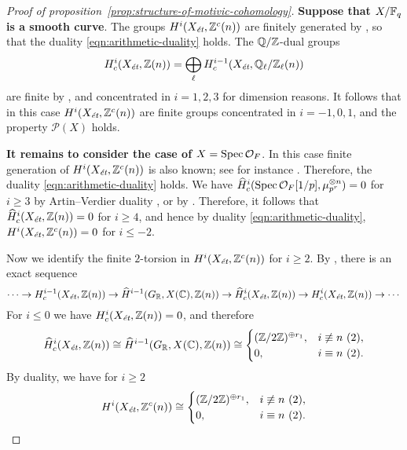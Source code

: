 \documentclass{article}
\numberwithin{equation}{section}
\begin{document}
\begin{proof}[Proof of proposition~\ref{prop:structure-of-motivic-cohomology}]
  \vspace{1em}

  \textbf{Suppose that $X/\FF_q$ is a smooth curve}. The groups
  $H^i (X_\et, \ZZ^c (n))$ are finitely generated by
  \cite[Proposition~4.3]{Geisser-2017}, so that the duality
  \eqref{eqn:arithmetic-duality} holds. The $\QQ/\ZZ$-dual groups
  \[ H^i_c (X_\et, \ZZ(n)) =
    \bigoplus_\ell H^{i-1}_c (X_\et, \QQ_\ell/\ZZ_\ell (n)) \]
  are finite by \cite[Theorem~3]{Kahn-2003}, and concentrated in
  $i = 1,2,3$ for dimension reasons. It follows that in this case
  $H^i (X_\et, \ZZ^c (n))$ are finite groups concentrated in $i = -1,0,1$,
  and the property $\mathcal{P} (X)$ holds.

  \vspace{1em}

  \textbf{It remains to consider the case of $X = \Spec \mathcal{O}_F$}.
  In this case finite generation of $H^i (X_\et, \ZZ^c (n))$ is also known; see
  for instance \cite[Proposition~4.14]{Geisser-2017}. Therefore, the duality
  \eqref{eqn:arithmetic-duality} holds. We have
  $\widehat{H}^i_c (\Spec \mathcal{O}_F [1/p], \mu_{p^r}^{\otimes n}) = 0$ for
  $i \ge 3$ by Artin--Verdier duality
  \cite[Chapter~II, Corollary~3.3]{Milne-ADT}, or by
  \cite[p.\,268]{Soule-1979}. Therefore, it follows that
  $\widehat{H}^i_c (X_\et, \ZZ (n)) = 0$ for $i \ge 4$, and hence by duality
  \eqref{eqn:arithmetic-duality}, $H^i (X_\et, \ZZ^c (n)) = 0$ for $i \le -2$.

  Now we identify the finite $2$-torsion in $H^i (X_\et, \ZZ^c (n))$ for
  $i \ge 2$. By \cite[Lemma~6.14]{Flach-Morin-2018}, there is an exact
  sequence
  \[ \cdots \to H^{i-1}_c (X_\et, \ZZ (n)) \to
    \widehat{H}^{i-1} (G_\RR, X (\CC), \ZZ (n)) \to
    \widehat{H}^i_c (X_\et, \ZZ (n)) \to
    H^i_c (X_\et, \ZZ (n)) \to \cdots \]
  For $i \le 0$ we have $H^i_c (X_\et, \ZZ (n)) = 0$, and therefore
  \[ \widehat{H}^i_c (X_\et, \ZZ (n)) \cong
    \widehat{H}^{i-1} (G_\RR, X (\CC), \ZZ (n)) \cong
    \begin{cases}
      (\ZZ/2\ZZ)^{\oplus r_1}, & i\not\equiv n ~ (2), \\
      0, & i\equiv n ~ (2).
    \end{cases} \]
  By duality, we have for $i \ge 2$
  \[ H^i (X_\et, \ZZ^c (n)) \cong
    \begin{cases}
      (\ZZ/2\ZZ)^{\oplus r_1}, & i\not\equiv n ~ (2), \\
      0, & i\equiv n ~ (2).
    \end{cases} \]


\end{proof}
\end{document}
